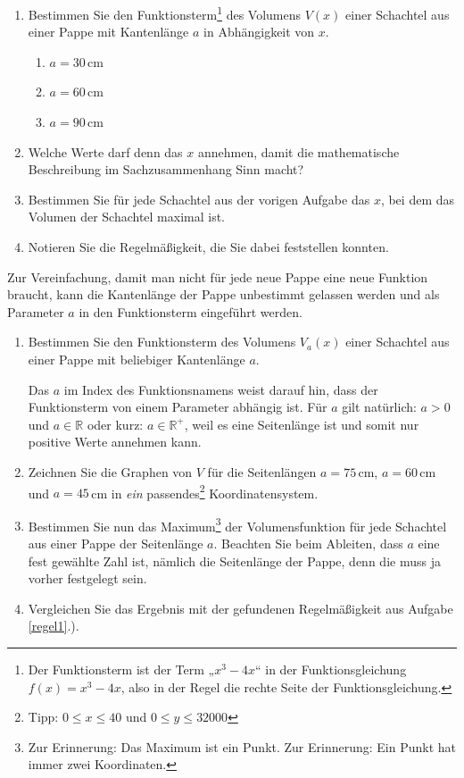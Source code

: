 \documentclass[12pt,a4paper,twoside,fleqn]{article}
\begin{document}
\begin{question}%
  \begin{enumerate}
  \item Bestimmen Sie den Funktionsterm\footnote{Der Funktionsterm ist
    der Term „$x^3-4x$“ in der Funktionsgleichung $f(x)=x^3-4x$, also
    in der Regel die rechte Seite der Funktionsgleichung.} des Volumens $V(x)$ einer Schachtel aus
    einer Pappe mit Kantenlänge $a$ in Abhängigkeit von $x$.
    \begin{multicols}{3}
      \begin{enumerate}
      \item $a=30\,$cm
      \item $a=60\,$cm
      \item $a=90\,$cm
      \end{enumerate}
    \end{multicols}
  \item Welche Werte darf denn das $x$ annehmen, damit die
    mathematische Beschreibung im Sachzusammenhang Sinn macht?
  \item Bestimmen Sie für jede Schachtel aus der vorigen Aufgabe das
    $x$, bei dem das Volumen der Schachtel maximal ist.
  \item \label{regel1}Notieren Sie die Regelmäßigkeit, die Sie dabei feststellen konnten.
  \end{enumerate}

  Zur Vereinfachung, damit man nicht für jede neue Pappe eine neue
  Funktion braucht, kann die Kantenlänge der Pappe unbestimmt gelassen 
  werden und als Parameter $a$ in den Funktionsterm eingeführt werden.
  \begin{enumerate}[resume]
  \item Bestimmen Sie den Funktionsterm des Volumens $V_a(x)$ einer
    Schachtel aus einer Pappe mit beliebiger Kantenlänge $a$.

    Das $a$
    im Index des Funktionsnamens weist darauf hin, dass der
    Funktionsterm von einem Parameter abhängig ist. Für $a$ gilt
    natürlich: $a > 0 $ und $a \in\mathbb{R}$ oder kurz:
    $a\in\mathbb{R}^+$, weil es eine Seitenlänge ist und somit nur
    positive Werte annehmen kann.
  \item Zeichnen Sie die Graphen von $V$ für die Seitenlängen
    $a=75\,$cm, $a=60\,$cm und $a=45\,$cm in \emph{ein}
    passendes\footnote{Tipp: $0 \leq x \leq 40$ und $0 \leq y \leq 32000$}
    Koordinatensystem. 
  \item Bestimmen Sie nun das Maximum\footnote{Zur Erinnerung: Das
      Maximum ist ein Punkt. Zur Erinnerung: Ein Punkt hat immer zwei
      Koordinaten.} der Volumensfunktion für jede 
    Schachtel aus einer Pappe der Seitenlänge $a$. Beachten Sie beim
    Ableiten, dass $a$ eine fest gewählte Zahl 
    ist, nämlich die Seitenlänge der Pappe, denn die muss ja vorher
    festgelegt sein.
  \item Vergleichen Sie das Ergebnis mit der gefundenen Regelmäßigkeit
    aus Aufgabe \ref{regel1}.).
  \end{enumerate}
\end{question}
\end{document}
